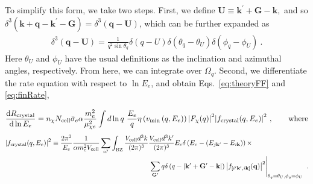 \documentclass[
    prd, twocolumn, superscriptaddress, nofootinbib, amsmath, amssymb,
    aps, floatfix,preprintnumbers
]{revtex4-2}
\begin{document}
        To simplify this form, we take two steps. First, we define $\mathbf{U\equiv k^\prime+G - k},$ and so $\delta^3\left(\mathbf{k + q - k^\prime - G}\right) = \delta^3(\mathbf{q - U})$, which can be further expanded as
        \begin{equation}
            \begin{split}
                \delta^3(\mathbf{q - U}) = \frac{1}{q^2 \sin{\theta_q}}\delta(q-U)\delta(\theta_q - \theta_U)\delta(\phi_q - \phi_U)\ .
            \end{split}
        \end{equation}
        Here $\theta_U$ and $\phi_U$ have the usual definitions as the inclination and azimuthal angles, respectively. From here, we can integrate over $\Omega_q$. Second, we differentiate the rate equation with respect to $\ln E_e$, and obtain Eqs.~\eqref{eq:theoryFF} and \eqref{eq:finRate},
        \begin{widetext}
            \begin{equation}
                \dv{R_\mathrm{crystal}}{\ln{E_e}} = n_\chi N_\mathrm{cell} \Bar{\sigma}_e \alpha \frac{m_e^2}{\mu_{\chi e}^2}\int d\ln{q}\ \frac{E_e}{q}\eta\left(v_\mathrm{min}\left(q, E_e\right)\right)\abs{F_\chi(q)}^2\abs{f_\mathrm{crystal}(q, E_e)}^2\ , \qquad\text{where}
            \end{equation}
            \begin{equation}
                \begin{split}
                    \left|f_{\rm crystal}(q, E_e)\right|^2 \equiv \frac{2\pi^2}{E_e}\frac{1}{\alpha m_e^2 V_\mathrm{cell}}\sum_{ii^\prime}\int_{\rm BZ}\frac{V_\mathrm{cell}d^3k}{(2\pi)^3}&\frac{V_\mathrm{cell}d^3k^\prime}{(2\pi)^3}E_e\delta\left(E_e - (E_{j\mathbf{k}^\prime} - E_{i\mathbf{k}})\right) \times\\
                    &\left.\sum_\mathbf{G^\prime}q\delta\left(q -\left|\mathbf{k^\prime+G^\prime - k}\right|\right)\left|f_{\left[i^\prime\mathbf{k}^\prime,i\mathbf{k}\right]}(\mathbf{q})\right|^2\right|_{\theta_q = \theta_U, \phi_q = \phi_U}\ .
                \end{split}
            \end{equation}
        \end{widetext}
\end{document}
